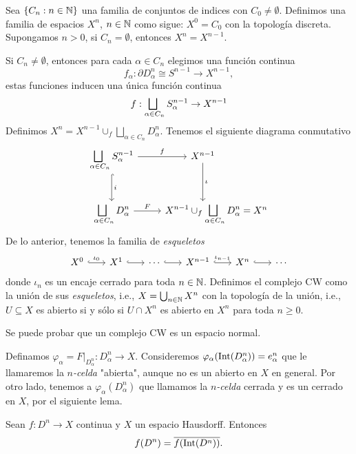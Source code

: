     \begin{definicion}
        Sea $\{C_n:n\in\mathbb{N}\}$ una familia de conjuntos de indices con $C_0\neq \emptyset$. Definimos una familia de espacios $X^n$, $n\in\mathbb{N}$ como sigue: $X^0=C_0$ con la topología discreta. Supongamos $n>0$, si $C_n=\emptyset$, entonces $X^n=X^{n-1}$.
        
        Si $C_n\neq \emptyset$, entonces para cada $\alpha\in C_n$ elegimos una función continua
        \begin{equation*}
            f_\alpha:\partial D^n_\alpha\cong S^{n-1}\to X^{n-1},
        \end{equation*}
        estas funciones inducen una única función continua $$f:\medsqcup_{\alpha\in C_n} S^{n-1}_\alpha\to X^{n-1}$$
    Definimos $X^n=X^{n-1}\cup_f\bigsqcup_{\alpha\in C_n} D^n_\alpha$. Tenemos el siguiente diagrama conmutativo
    \begin{equation*}
        \begin{tikzcd}[column sep =0.85cm, row sep=1cm
]
            \displaystyle\medsqcup_{\alpha\in C_n} S^{n-1}_\alpha\arrow["f",r]\arrow["i",d, hook] & X^{n-1}\arrow["\iota",d]\\
            \displaystyle\medsqcup_{\alpha\in C_n} D^n_\alpha\arrow["F",r] & \displaystyle X^{n-1}\cup_f \medsqcup_{\alpha\in C_n} D^n_\alpha &[-1.05cm]=X^n
        \end{tikzcd}
    \end{equation*}
    De lo anterior, tenemos la familia de \textit{esqueletos}
    \begin{equation*}
        \begin{tikzcd}[column sep = 0.65cm]
            X^0\arrow[r,"\iota_0",hook] & X^1\arrow[r,hook] & \cdots \arrow[r,hook] & X^{n-1}\arrow[r, "\iota_{n-1}",hook] & X^n\arrow[r, hook] & \cdots 
        \end{tikzcd}
    \end{equation*}
    donde $\iota_n$ es un encaje cerrado para toda $n\in \mathbb{N}$. Definimos el complejo CW como la unión de sus \textit{esqueletos}, i.e., $X=\bigcup_{n\in\mathbb{N}}X^n$ con la topología de la unión, i.e., $U\subseteq X$ es abierto si y sólo si $U\cap X^n$ es abierto en $X^n$ para toda $n\geq 0.$
    \end{definicion}
    \begin{nota}
        Se puede probar que un complejo CW es un espacio normal.
    \end{nota}
    \begin{definicion}
        Definamos $\varphi_\alpha=F|_{D_\alpha^n}:D_\alpha^n\to X$. Consideremos $\varphi_\alpha(\mathrm{Int}(D^n_\alpha))=e^n_\alpha$ que le llamaremos la \textit{$n$-celda} "abierta", aunque no es un abierto en $X$ en general. Por otro lado, tenemos a $\varphi_\alpha(D^n_\alpha)$ que llamamos la \textit{$n$-celda} cerrada y es un cerrado en $X$, por el siguiente lema.
    \end{definicion}
    \begin{lema}
        Sean $f:D^n\to X$ continua y $X$ un espacio Hausdorff. Entonces 
        $$f(D^n)=\overline{f(\mathrm{Int}(D^n))}.$$
    \end{lema}

